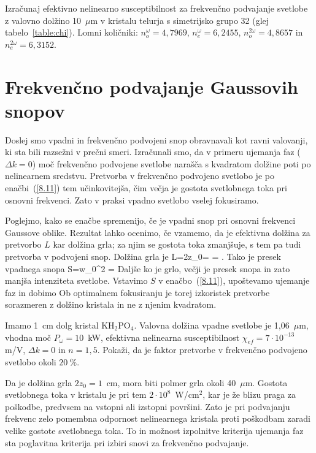 \begin{definition}
Izračunaj efektivno nelinearno susceptibilnost za frekvenčno podvajanje svetlobe z valovno
dolžino 10~$\mu$m v kristalu telurja s simetrijsko grupo 32 (glej tabelo~\ref{table:chi}). 
Lomni količniki: $n_o^{\omega} = 4,7969$, 
$n_e^{\omega} = 6,2455$, $n_o^{2\omega} = 4,8657$ in $n_e^{2\omega} = 6,3152$.
\end{definition}

\section{Frekvenčno podvajanje Gaussovih snopov}
Doslej smo vpadni in frekvenčno podvojeni snop obravnavali kot ravni valovanji,
ki sta bili razsežni v prečni smeri. Izračunali smo, da v primeru 
ujemanja faz ($\Delta k=0$)
moč frekvenčno podvojene svetlobe narašča s kvadratom dolžine poti po nelinearnem
sredstvu. Pretvorba v frekvenčno podvojeno svetlobo je po enačbi~(\ref{8.11}) tem
učinkovitejša, čim večja je gostota svetlobnega toka pri osnovni frekvenci.
Zato v praksi vpadno svetlobo vselej fokusiramo.  

Poglejmo, kako se enačbe spremenijo, če je vpadni snop pri osnovni 
frekvenci Gaussove oblike. 
Rezultat lahko ocenimo, če vzamemo, da je
efektivna dolžina za pretvorbo $L$ kar dolžina grla; za njim se
gostota toka zmanjšuje, s tem pa tudi pretvorba v podvojeni snop.
Dolžina grla je 
\beq
L=2z_{0}= = .
\label{SHGG}
\eeq
Tako je presek vpadnega snopa
\beq
S=\pi w_{0}^{2} = 
\eeq
Daljše ko je grlo, večji je presek snopa in zato manjša intenziteta svetlobe. 
Vstavimo $S$ v enačbo~(\ref{8.11}), upoštevamo ujemanje faz in dobimo 
Ob optimalnem fokusiranju je torej izkoristek pretvorbe sorazmeren z 
dolžino kristala in ne z njenim kvadratom.

\begin{definition}
Imamo 1~cm dolg kristal KH$_{2}$PO$_{4}$. Valovna dolžina vpadne svetlobe 
je 1,06~$\mu$m, vhodna moč $P_\omega = 10$~kW, efektivna nelinearna susceptibilnost
$\chi_{ef}=7\cdot10^{-13}~$m/V, $\Delta k=0$ in $n=1,5$. Pokaži, da je
faktor pretvorbe v frekvenčno podvojeno svetlobo okoli $20~\%$.

Da je dolžina grla $2z_{0}=1$~cm, mora biti polmer
grla okoli 40~$\mu$m. Gostota svetlobnega toka v kristalu je pri
tem $2\cdot10^{8}$~W/cm$^{2}$, kar je že blizu praga za poškodbe,
predvsem na vstopni ali izstopni površini. Zato je pri podvajanju frekvenc
zelo pomembna odpornost nelinearnega kristala proti poškodbam
zaradi velike gostote svetlobnega toka. To in možnost izpolnitve kriterija ujemanja 
faz sta poglavitna kriterija pri izbiri snovi za frekvenčno podvajanje. 
\end{definition}

